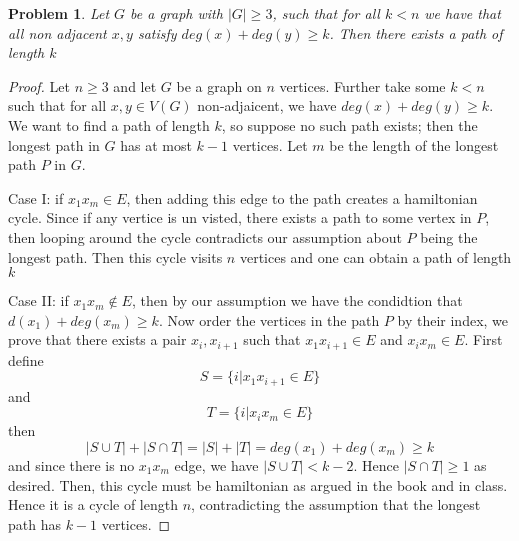 \documentclass{article}
\newtheorem{prb}{Problem}
\begin{document}
\begin{prb} Let $G$ be a graph with $|G| \geq 3$, such that for all  $k < n$ we have that all non adjacent $x, y$ satisfy $deg(x) + deg(y) \geq k$. Then there 
exists a path of length $k$\end{prb} 
\begin{proof} 
	Let $n \geq 3$ and let $G$ be a graph on $n$ vertices. Further take some $k < n$ such that for all $x, y \in V(G)$ non-adjaicent, we have 
	$deg(x) + deg(y) \geq k$. We want to find a path of length $k$, so suppose no such path exists; then the longest path in $G$ has at
	most $k-1$ vertices. Let $m$ be the length of the longest path $P$ in $G$. 

	Case I: if $x_1 x_m \in E$, then adding this edge to the path creates a hamiltonian cycle. Since if any vertice is un visted, 
	there exists a path to some vertex in $P$, then looping around the cycle contradicts our assumption about $P$ being the longest path. 
	Then this cycle visits $n$ vertices and one can obtain a path of length $k$ 


	Case II: if $x_1 x_m \notin E$, then by our assumption we have the condidtion that $d(x_1) + deg(x_m) \geq k$. 
	Now order the vertices in the path $P$ by their index, we prove that there exists a pair $x_i, x_{i+1} $ such that 
	$x_1 x_{i + 1} \in E$ and $ x_{i} x_m \in E$.  
	First define
	\[
		S = \{ i | x_1 x_{i + 1} \in E \} 
	\]
	and 
	\[	
		T = \{ i | x_i x_m \in E \}  
	\]
	then 
	\[
		|S \cup T| + |S \cap T| = |S| + |T| = deg(x_1) + deg(x_m) \geq k
	\]
	and since there is no $x_1 x_m$ edge, we have  $|S \cup T| < k-2$. Hence $|S \cap T| \geq 1$ as desired. 
	Then, this cycle must be hamiltonian as argued in the book and in class. Hence it is a cycle of length $n$, contradicting 
	the assumption that the longest path has $k-1$ vertices. 

	
\end{proof} 
\end{document}
